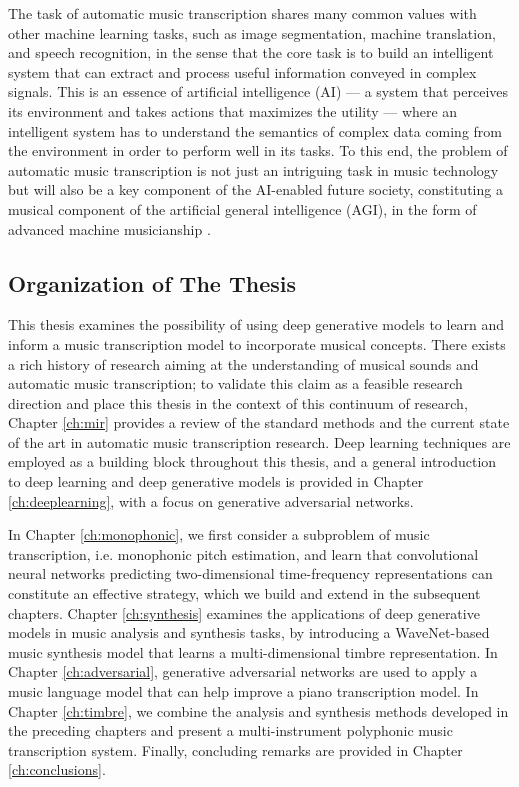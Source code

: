 The task of automatic music transcription shares many common values with other machine learning tasks, such as image segmentation, machine translation, and speech recognition, in the sense that the core task is to build an intelligent system that can extract and process useful information conveyed in complex signals.
This is an essence of artificial intelligence (AI)
--- a system that perceives its environment and takes actions that maximizes the utility \cite{russell2009ai} --- 
where an intelligent system has to understand the semantics of complex data coming from the environment in order to perform well in its tasks.
To this end, the problem of automatic music transcription is not just an intriguing task in music technology but will also be a key component of the AI-enabled future society, constituting a musical component of the artificial general intelligence (AGI), in the form of advanced machine musicianship \cite{rowe2003musicianship}.


\subsection{Organization of The Thesis}


This thesis examines the possibility of using deep generative models to learn and inform a music transcription model to incorporate musical concepts.
There exists a rich history of research aiming at the understanding of musical sounds and automatic music transcription; to validate this claim as a feasible research direction and place this thesis in the context of this continuum of research, Chapter \ref{ch:mir} provides a review of the standard methods and the current state of the art in automatic music transcription research.
Deep learning techniques are employed as a building block throughout this thesis, and a general introduction to deep learning and deep generative models is provided in Chapter \ref{ch:deeplearning}, with a focus on generative adversarial networks.

In Chapter \ref{ch:monophonic}, we first consider a subproblem of music transcription, i.e. monophonic pitch estimation, and learn that convolutional neural networks predicting two-dimensional time-frequency representations can constitute an effective strategy, which we build and extend in the subsequent chapters.
Chapter \ref{ch:synthesis} examines the applications of deep generative models in music analysis and synthesis tasks, by introducing a WaveNet-based music synthesis model that learns a multi-dimensional timbre representation.
In Chapter \ref{ch:adversarial}, generative adversarial networks are used to apply a music language model that can help improve a piano transcription model.
In Chapter \ref{ch:timbre}, we combine the analysis and synthesis methods developed in the preceding chapters and present a multi-instrument polyphonic music transcription system.
Finally, concluding remarks are provided in Chapter \ref{ch:conclusions}.


